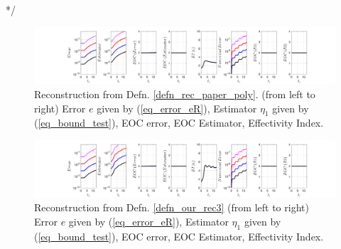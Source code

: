 \documentclass[12pt,a4paper]{article}
\numberwithin{equation}{section}
\theoremstyle{definition}
\begin{document}
*/
\begin{figure}[H]
	\hspace{-3cm}
	\includegraphics[scale=0.55]{fig_LeapFrogplots_1x5_sin_IC_harmonic_u4_v6_paperrec_poly_our_res}	
	\caption{Reconstruction from Defn. \ref{defn_rec_paper_poly}. (from left to right) Error $e$ given by (\ref{eq_error_eR}), Estimator $\eta_1$ given by (\ref{eq_bound_test}), EOC error, EOC Estimator, Effectivity Index.}
	\label{fig_all_in_one_paperrec_poly_u04_v06}
\end{figure}

\begin{figure}[H]
	\hspace{-3cm}
	\includegraphics[scale=0.55]{fig_LeapFrogplots_1x5_sin_IC_harmonic_u4_v6_paperrec_poly_tristan}	
\caption{Reconstruction from Defn. \ref{defn_our_rec3} (from left to right) Error $e$ given by (\ref{eq_error_eR}), Estimator $\eta_1$ given by (\ref{eq_bound_test}), EOC error, EOC Estimator, Effectivity Index.}
	\label{fig_all_in_one_paperrec_poly_tristan_u4_v6}
\end{figure}
\end{document}
